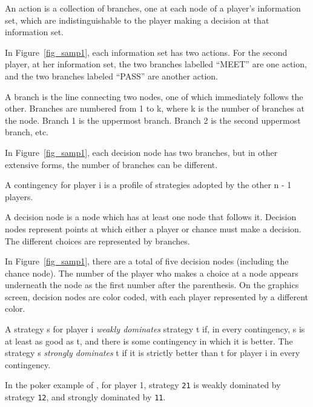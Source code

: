\begin{helpglossary}
%
\setfooter{\thepage}{}{}{}{}{\thepage}%

\label{actiongloss}
An action is a collection of branches, one at each node of a player's information 
set, which are indistinguishable to the player making a decision at that 
information set. 

In Figure~\ref{fig_samp1}, each information set has two actions.  For the 
second player, at her information set, the two branches labelled ``MEET'' are one 
action, and the two branches labeled ``PASS'' are another action.  
 
\label{branchgloss}
A branch is the line connecting two nodes, one of which immediately 
follows the other.  Branches are numbered from 1 to k, where k is the 
number of branches at the node.  Branch 1 is the uppermost branch.  Branch 
2 is the second uppermost branch, etc. 

In Figure~\ref{fig_samp1}, each decision node has two branches, but in
other extensive forms, the number of branches can be different.

\label{continggloss}
A contingency for player i is a profile of strategies adopted by the other
 n - 1 players.

\label{decnodegloss}
A decision node is a node which has at least one node that follows it.  
Decision nodes represent points at which either a player or chance must 
make a decision.  The different choices are represented by branches.

In Figure~\ref{fig_samp1}, there are a total of five decision nodes (including the chance node). 
 The number of the player who makes a choice at a node appears underneath the
node as the first number after the parenthesis.  On the graphics screen,
decision nodes are color coded, with each player represented by a
different color.

\label{dominationgloss}
A strategy s for player i 
{\em weakly dominates} strategy t if, in every contingency, s 
is at least as good as t, and there is some contingency in which it is 
better.  The strategy s {\em strongly dominates} t if it is 
strictly better than t for player i in every contingency.  

In the poker example of , 
for player 1, strategy \verb+21+ is weakly dominated by strategy \verb+12+, 
and strongly dominated by \verb+11+. 


\end{helpglossary}
